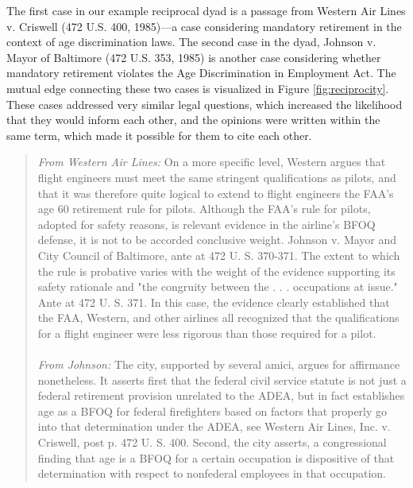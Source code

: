 \documentclass[headsepline=true, abstracton]{scrartcl}
\begin{document}
The first case in our example reciprocal dyad is a passage from Western Air Lines v. Criswell (472 U.S. 400, 1985)---a case considering mandatory retirement in the context of age discrimination laws. The second case in the dyad, Johnson v. Mayor of Baltimore (472 U.S. 353, 1985) is another case considering whether mandatory retirement violates the Age Discrimination in Employment Act. The mutual edge connecting these two cases is visualized in Figure \ref{fig:reciprocity}. These cases addressed very similar legal questions, which increased the likelihood that they would inform each other, and the opinions were written within the same term, which made it possible for them to cite each other. 
\begin{quotation}
{\em From Western Air Lines:} On a more specific level, Western argues that flight engineers must meet the same stringent qualifications as pilots, and that it was therefore quite logical to extend to flight engineers the FAA's age 60 retirement rule for pilots. Although the FAA's rule for pilots, adopted for safety reasons, is relevant evidence in the airline's BFOQ defense, it is not to be accorded conclusive weight. Johnson v. Mayor and City Council of Baltimore, ante at 472 U. S. 370-371. The extent to which the rule is probative varies with the weight of the evidence supporting its safety rationale and "the congruity between the . . . occupations at issue." Ante at 472 U. S. 371. In this case, the evidence clearly established that the FAA, Western, and other airlines all recognized that the qualifications for a flight engineer were less rigorous than those required for a pilot.
\\~\\
{\em From Johnson:} The city, supported by several amici, argues for affirmance nonetheless. It asserts first that the federal civil service statute is not just a federal retirement provision unrelated to the ADEA, but in fact establishes age as a BFOQ for federal firefighters based on factors that properly go into that determination under the ADEA, see Western Air Lines, Inc. v. Criswell, post p. 472 U. S. 400. Second, the city asserts, a congressional finding that age is a BFOQ for a certain occupation is dispositive of that determination with respect to nonfederal employees in that occupation. 
\end{quotation} %
\end{document}
